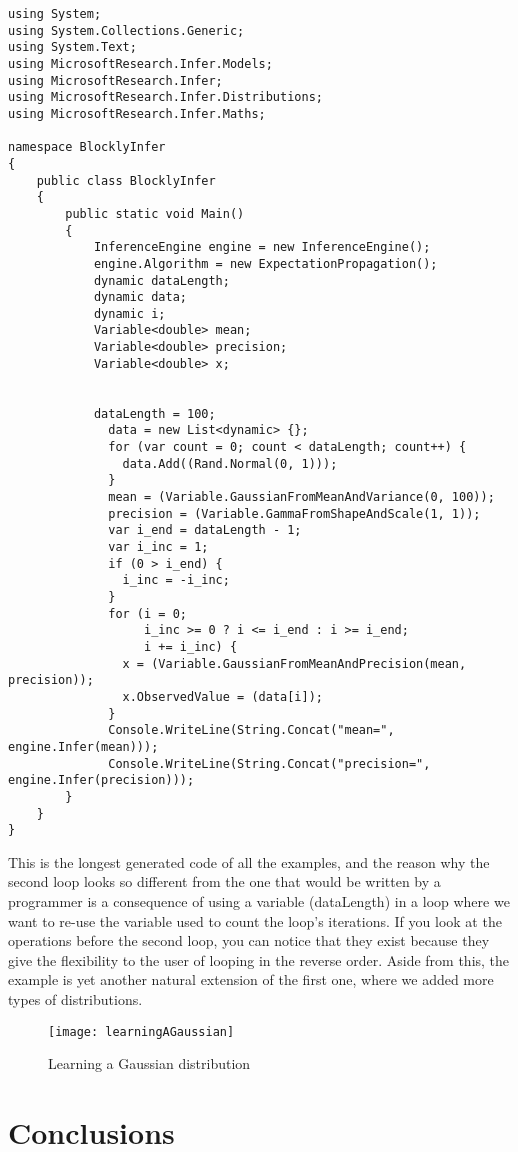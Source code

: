\begin{lstlisting}
using System;
using System.Collections.Generic;
using System.Text;
using MicrosoftResearch.Infer.Models;
using MicrosoftResearch.Infer;
using MicrosoftResearch.Infer.Distributions;
using MicrosoftResearch.Infer.Maths;

namespace BlocklyInfer
{
	public class BlocklyInfer
	{
		public static void Main()
		{
			InferenceEngine engine = new InferenceEngine();
			engine.Algorithm = new ExpectationPropagation();
			dynamic dataLength;
			dynamic data;
			dynamic i;
			Variable<double> mean;
			Variable<double> precision;
			Variable<double> x;


			dataLength = 100;
			  data = new List<dynamic> {};
			  for (var count = 0; count < dataLength; count++) {
			    data.Add((Rand.Normal(0, 1)));
			  }
			  mean = (Variable.GaussianFromMeanAndVariance(0, 100));
			  precision = (Variable.GammaFromShapeAndScale(1, 1));
			  var i_end = dataLength - 1;
			  var i_inc = 1;
			  if (0 > i_end) {
			    i_inc = -i_inc;
			  }
			  for (i = 0;
			       i_inc >= 0 ? i <= i_end : i >= i_end;
			       i += i_inc) {
			    x = (Variable.GaussianFromMeanAndPrecision(mean, precision));
			    x.ObservedValue = (data[i]);
			  }
			  Console.WriteLine(String.Concat("mean=", engine.Infer(mean)));
			  Console.WriteLine(String.Concat("precision=", engine.Infer(precision)));
		}
	}
}
\end{lstlisting}

This is the longest generated code of all the examples, and the reason why the
second loop looks so different from the one that would be written by a programmer
is a consequence of using a variable (dataLength) in a loop where we want to
re-use the variable used to count the loop's iterations. If you look at the
operations before the second loop, you can notice that they exist because they
give the flexibility to the user of looping in the reverse order. Aside from
this, the example is yet another natural extension of the first one, where we
added more types of distributions.

\begin{figure}[!htpb]
  \begin{center}
    \leavevmode
    \texttt{[image: learningAGaussian]}
    \caption{Learning a Gaussian distribution}
    \label{fig:learningAGaussian}
  \end{center}
\end{figure}

\section{Conclusions}

